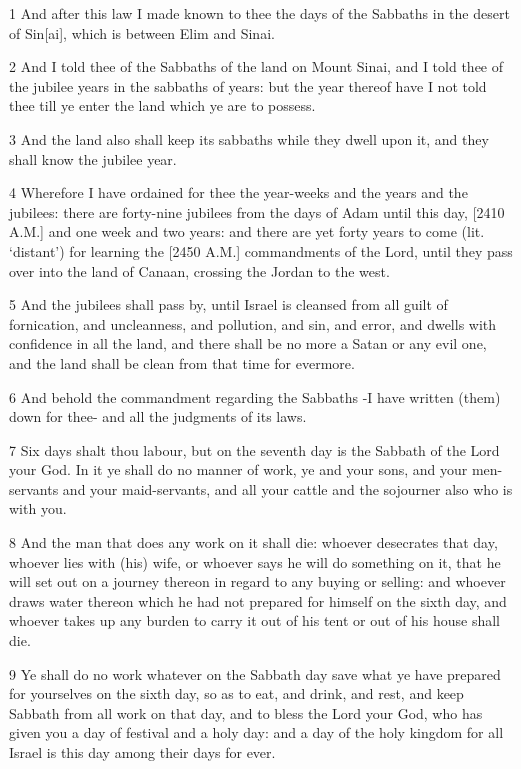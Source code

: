 \par 1 And after this law I made known to thee the days of the Sabbaths in the desert of Sin[ai], which is between Elim and Sinai.
\par 2 And I told thee of the Sabbaths of the land on Mount Sinai, and I told thee of the jubilee years in the sabbaths of years: but the year thereof have I not told thee till ye enter the land which ye are to possess.
\par 3 And the land also shall keep its sabbaths while they dwell upon it, and they shall know the jubilee year.
\par 4 Wherefore I have ordained for thee the year-weeks and the years and the jubilees: there are forty-nine jubilees from the days of Adam until this day, [2410 A.M.] and one week and two years: and there are yet forty years to come (lit. ‘distant’) for learning the [2450 A.M.] commandments of the Lord, until they pass over into the land of Canaan, crossing the Jordan to the west.
\par 5 And the jubilees shall pass by, until Israel is cleansed from all guilt of fornication, and uncleanness, and pollution, and sin, and error, and dwells with confidence in all the land, and there shall be no more a Satan or any evil one, and the land shall be clean from that time for evermore.
\par 6 And behold the commandment regarding the Sabbaths -I have written (them) down for thee- and all the judgments of its laws.
\par 7 Six days shalt thou labour, but on the seventh day is the Sabbath of the Lord your God. In it ye shall do no manner of work, ye and your sons, and your men- servants and your maid-servants, and all your cattle and the sojourner also who is with you.
\par 8 And the man that does any work on it shall die: whoever desecrates that day, whoever lies with (his) wife, or whoever says he will do something on it, that he will set out on a journey thereon in regard to any buying or selling: and whoever draws water thereon which he had not prepared for himself on the sixth day, and whoever takes up any burden to carry it out of his tent or out of his house shall die.
\par 9 Ye shall do no work whatever on the Sabbath day save what ye have prepared for yourselves on the sixth day, so as to eat, and drink, and rest, and keep Sabbath from all work on that day, and to bless the Lord your God, who has given you a day of festival and a holy day: and a day of the holy kingdom for all Israel is this day among their days for ever.
